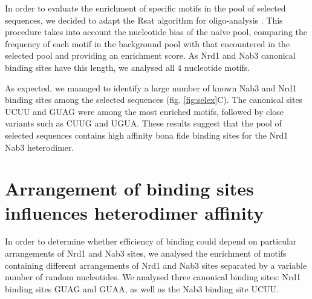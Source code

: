 In order to evaluate the enrichment of specific motifs in the pool of selected sequences, we decided to adapt the Rsat algorithm for oligo-analysis \cite[,see methods]{vanhelden:1998:extracting}. This procedure takes into account the nucleotide bias of the naïve pool, comparing the frequency of each motif in the background pool with that encountered in the selected pool and providing an enrichment score. As Nrd1 and Nab3 canonical binding sites have this length, we analysed all 4 nucleotide motifs.

As expected, we managed to identify a large number of known Nab3 and Nrd1 binding sites among the selected sequences (fig. \ref{fig:selex}C). The canonical sites UCUU and GUAG were among the most enriched motifs, followed by close variants such as CUUG and UGUA. These results suggest that the pool of selected sequences contains high affinity bona fide binding sites for the Nrd1 Nab3 heterodimer. 

\singlespacing
\section{Arrangement of binding sites influences heterodimer affinity \invitro{}}
\doublespacing

In order to determine whether efficiency of binding could depend on particular arrangements of Nrd1 and Nab3 sites, we analysed the enrichment of motifs containing different arrangements of Nrd1 and Nab3 sites separated by a variable number of random nucleotides. We analysed three canonical binding sites: Nrd1 binding sites GUAG and GUAA, as well as the Nab3 binding site UCUU.

